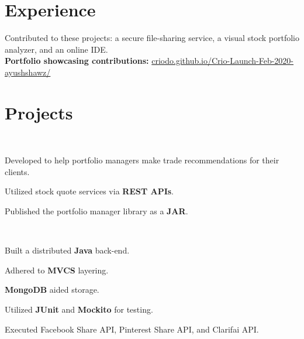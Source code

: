 \documentclass[]{deedy-resume-openfont}
\begin{document}
\begin{minipage}[t]{0.66\textwidth} 


\section{Experience}
Contributed to these projects: a secure file-sharing service, a visual stock portfolio analyzer, and an online IDE.\\
\textbf{Portfolio showcasing contributions:} \href{https://criodo.github.io/Crio-Launch-Feb-2020-ayushshawz/}{criodo.github.io/Crio-Launch-Feb-2020-ayushshawz/}\\


\section{Projects}

\\
\sectionsep
\begin{tightemize}
\item Developed to help portfolio managers make trade recommendations for their clients.
\item Utilized stock quote services via \textbf{REST APIs}.
\item Published the portfolio manager library as a \textbf{JAR}.
\end{tightemize}
\sectionsep

\\
\begin{tightemize}
\item Built a distributed \textbf{Java} back-end.
\item Adhered to \textbf{MVCS} layering. 
\item \textbf{MongoDB} aided storage. 
\item Utilized \textbf{JUnit} and \textbf{Mockito} for testing.
\item Executed Facebook Share API, Pinterest Share API, and Clarifai API.
\end{tightemize}
\sectionsep


\end{minipage}
\end{document}
